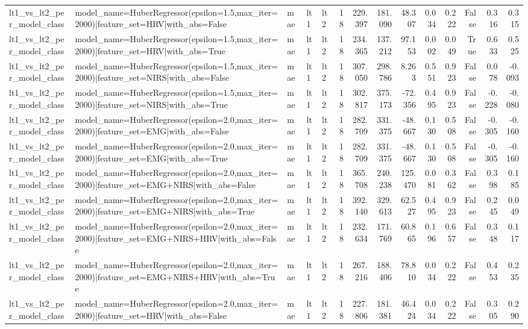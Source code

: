 \begin{table}
\begin{tabular}{lllllrrrrrrrrr}
lt1_vs_lt2_per_model_class & model_name=HuberRegressor(epsilon=1.5,max_iter=2000)|feature_set=HRV|with_abs=False & mae & lt1 & lt2 & 18 & 229.397 & 181.090 & 48.307 & 0.034 & 0.222 & False & 0.316 & 0.315 \\
lt1_vs_lt2_per_model_class & model_name=HuberRegressor(epsilon=1.5,max_iter=2000)|feature_set=HRV|with_abs=True & mae & lt1 & lt2 & 18 & 234.365 & 137.212 & 97.153 & 0.002 & 0.049 & True & 0.633 & 0.525 \\
lt1_vs_lt2_per_model_class & model_name=HuberRegressor(epsilon=1.5,max_iter=2000)|feature_set=NIRS|with_abs=False & mae & lt1 & lt2 & 18 & 307.050 & 298.786 & 8.263 & 0.551 & 0.923 & False & 0.078 & -0.093 \\
lt1_vs_lt2_per_model_class & model_name=HuberRegressor(epsilon=1.5,max_iter=2000)|feature_set=NIRS|with_abs=True & mae & lt1 & lt2 & 18 & 302.817 & 375.173 & -72.356 & 0.495 & 0.923 & False & -0.228 & -0.080 \\
lt1_vs_lt2_per_model_class & model_name=HuberRegressor(epsilon=2.0,max_iter=2000)|feature_set=EMG|with_abs=False & mae & lt1 & lt2 & 18 & 282.709 & 331.375 & -48.667 & 0.130 & 0.508 & False & -0.305 & -0.160 \\
lt1_vs_lt2_per_model_class & model_name=HuberRegressor(epsilon=2.0,max_iter=2000)|feature_set=EMG|with_abs=True & mae & lt1 & lt2 & 18 & 282.709 & 331.375 & -48.667 & 0.130 & 0.508 & False & -0.305 & -0.160 \\
lt1_vs_lt2_per_model_class & model_name=HuberRegressor(epsilon=2.0,max_iter=2000)|feature_set=EMG+NIRS|with_abs=False & mae & lt1 & lt2 & 18 & 365.708 & 240.238 & 125.470 & 0.081 & 0.362 & False & 0.398 & 0.185 \\
lt1_vs_lt2_per_model_class & model_name=HuberRegressor(epsilon=2.0,max_iter=2000)|feature_set=EMG+NIRS|with_abs=True & mae & lt1 & lt2 & 18 & 392.140 & 329.613 & 62.527 & 0.495 & 0.923 & False & 0.245 & 0.049 \\
lt1_vs_lt2_per_model_class & model_name=HuberRegressor(epsilon=2.0,max_iter=2000)|feature_set=EMG+NIRS+HRV|with_abs=False & mae & lt1 & lt2 & 18 & 232.634 & 171.769 & 60.865 & 0.196 & 0.657 & False & 0.348 & 0.117 \\
lt1_vs_lt2_per_model_class & model_name=HuberRegressor(epsilon=2.0,max_iter=2000)|feature_set=EMG+NIRS+HRV|with_abs=True & mae & lt1 & lt2 & 18 & 267.216 & 188.406 & 78.810 & 0.034 & 0.222 & False & 0.453 & 0.235 \\
lt1_vs_lt2_per_model_class & model_name=HuberRegressor(epsilon=2.0,max_iter=2000)|feature_set=HRV|with_abs=False & mae & lt1 & lt2 & 18 & 227.806 & 181.381 & 46.424 & 0.034 & 0.222 & False & 0.305 & 0.290 \\

\end{tabular}
\end{table}
